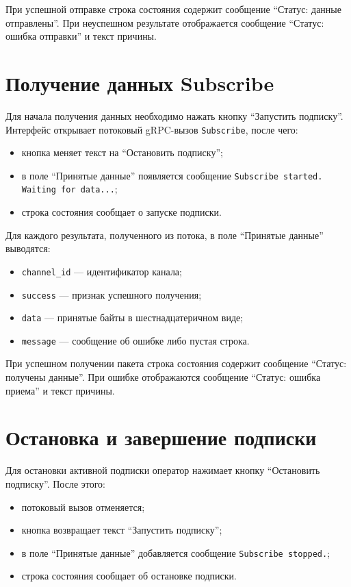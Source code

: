 При успешной отправке строка состояния содержит сообщение
``Статус: данные отправлены''. При неуспешном результате отображается сообщение
``Статус: ошибка отправки'' и текст причины.

\section{Получение данных Subscribe}

Для начала получения данных необходимо нажать кнопку
``Запустить подписку''. Интерфейс открывает потоковый gRPC-вызов
\texttt{Subscribe}, после чего:

\begin{itemize}
	\item кнопка меняет текст на ``Остановить подписку'';
	\item в поле ``Принятые данные'' появляется сообщение \texttt{Subscribe started. Waiting for data...};
	\item строка состояния сообщает о запуске подписки.
\end{itemize}

Для каждого результата, полученного из потока, в поле ``Принятые данные''
выводятся:

\begin{itemize}
	\item \texttt{channel\_id} --- идентификатор канала;
	\item \texttt{success} --- признак успешного получения;
	\item \texttt{data} --- принятые байты в шестнадцатеричном виде;
	\item \texttt{message} --- сообщение об ошибке либо пустая строка.
\end{itemize}

При успешном получении пакета строка состояния содержит сообщение
``Статус: получены данные''. При ошибке отображаются сообщение
``Статус: ошибка приема'' и текст причины.

\section{Остановка и завершение подписки}

Для остановки активной подписки оператор нажимает кнопку
``Остановить подписку''. После этого:

\begin{itemize}
	\item потоковый вызов отменяется;
	\item кнопка возвращает текст ``Запустить подписку'';
	\item в поле ``Принятые данные'' добавляется сообщение \texttt{Subscribe stopped.};
	\item строка состояния сообщает об остановке подписки.
\end{itemize}

